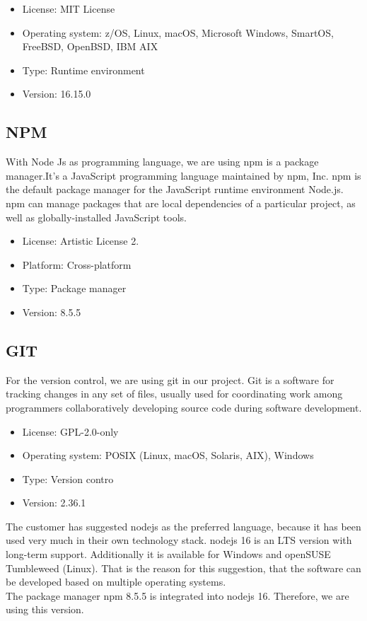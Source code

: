 \documentclass[12pt, a4paper]{article}
\begin{document}
\begin{itemize}
    \item License: MIT License
    \item Operating system: z/OS, Linux, macOS, Microsoft Windows, SmartOS, FreeBSD, OpenBSD, IBM AIX
    \item Type: Runtime environment
    \item Version: 16.15.0
\end{itemize}

\subsection*{NPM}

With Node Js as programming language, we are using npm is a package manager.It's a JavaScript programming language maintained by npm, Inc. npm is the default package manager for the JavaScript runtime environment Node.js. npm can manage packages that are local dependencies of a particular project, as well as globally-installed JavaScript tools.

\begin{itemize}
    \item License: Artistic License 2.
    \item Platform: Cross-platform
    \item Type: Package manager
    \item Version: 8.5.5
\end{itemize}

\subsection*{GIT}

For the version control, we are using git in our project. Git is a software for tracking changes in any set of files, usually used for coordinating work among programmers collaboratively developing source code during software development.

\begin{itemize}
    \item License: GPL-2.0-only
    \item Operating system: POSIX (Linux, macOS, Solaris, AIX), Windows
    \item Type: Version contro
    \item Version: 2.36.1
\end{itemize}

\noindent The customer has suggested nodejs as the preferred language, because it has been used very much in their own technology stack. nodejs 16 is an LTS version with long-term support. Additionally it is available for Windows and openSUSE Tumbleweed (Linux). That is the reason for this suggestion, that the software can be developed based on multiple operating systems. \\
The package manager npm 8.5.5 is integrated into nodejs 16. Therefore, we are using this version.
\end{document}
